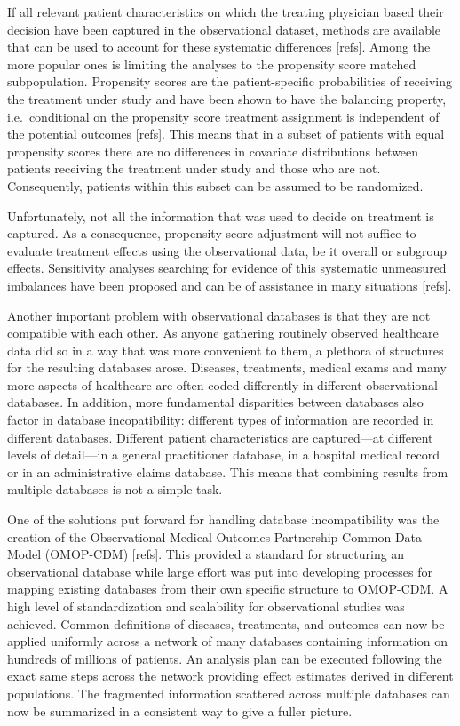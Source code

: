 \documentclass[
]{book}
\begin{document}
If all relevant patient characteristics on which the treating physician based
their decision have been captured in the observational dataset, methods are
available that can be used to account for these systematic differences
{[}refs{]}. Among the more popular ones is limiting the analyses to the propensity
score matched subpopulation. Propensity scores are the patient-specific
probabilities of receiving the treatment under study and have been shown to have
the balancing property, i.e.~conditional on the propensity score treatment
assignment is independent of the potential outcomes {[}refs{]}. This means that in a
subset of patients with equal propensity scores there are no differences in
covariate distributions between patients receiving the treatment under study and
those who are not. Consequently, patients within this subset can be assumed to
be randomized.

Unfortunately, not all the information that was used to decide on treatment is
captured. As a consequence, propensity score adjustment will not suffice to
evaluate treatment effects using the observational data, be it overall or
subgroup effects. Sensitivity analyses searching for evidence of this systematic
unmeasured imbalances have been proposed and can be of assistance in many
situations {[}refs{]}.

Another important problem with observational databases is that they are not
compatible with each other. As anyone gathering routinely observed healthcare
data did so in a way that was more convenient to them, a plethora of structures
for the resulting databases arose. Diseases, treatments, medical exams and many
more aspects of healthcare are often coded differently in different
observational databases. In addition, more fundamental disparities between
databases also factor in database incopatibility: different types of information
are recorded in different databases. Different patient characteristics are
captured---at different levels of detail---in a general practitioner database,
in a hospital medical record or in an administrative claims database. This means
that combining results from multiple databases is not a simple task.

One of the solutions put forward for handling database incompatibility was the
creation of the Observational Medical Outcomes Partnership Common Data Model
(OMOP-CDM) {[}refs{]}. This provided a standard for structuring an observational
database while large effort was put into developing processes for mapping
existing databases from their own specific structure to OMOP-CDM. A high level of
standardization and scalability for observational studies was achieved. Common
definitions of diseases, treatments, and outcomes can now be applied uniformly
across a network of many databases containing information on hundreds of
millions of patients. An analysis plan can be executed following the exact same
steps across the network providing effect estimates derived in different
populations. The fragmented information scattered across multiple databases can
now be summarized in a consistent way to give a fuller picture.
\end{document}

